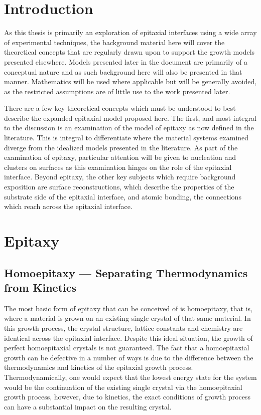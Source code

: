 \section{Introduction}
As this thesis is primarily an exploration of epitaxial interfaces using a wide array of experimental techniques, the background material here will cover the theoretical concepts that are regularly drawn upon to support the growth models presented elsewhere.
Models presented later in the document are primarily of a conceptual nature and as such background here will also be presented in that manner.
Mathematics will be used where applicable but will be generally avoided, as the restricted assumptions are of little use to the work presented later.

There are a few key theoretical concepts which must be understood to best describe the expanded epitaxial model proposed here.
The first, and most integral to the discussion is an examination of the model of epitaxy as now defined in the literature.
This is integral to differentiate where the material systems examined diverge from the idealized models presented in the literature.
As part of the examination of epitaxy, particular attention will be given to nucleation and clusters on surfaces as this examination hinges on the role of the epitaxial interface.
Beyond epitaxy, the other key subjects which require background exposition are surface reconstructions, which describe the properties of the substrate side of the epitaxial interface, and atomic bonding, the connections which reach across the epitaxial interface.

\section{Epitaxy}
\subsection{Homoepitaxy --- Separating Thermodynamics from Kinetics}
The most basic form of epitaxy that can be conceived of is homoepitaxy, that is, where a material is grown on an existing single crystal of that same material.
In this growth process, the crystal structure, lattice constants and chemistry are identical across the epitaxial interface.
Despite this ideal situation, the growth of perfect homoepitaxial crystals is not guaranteed.
The fact that a homoepitaxial growth can be defective in a number of ways is due to the difference between the thermodynamics and kinetics of the epitaxial growth process.
Thermodynamically, one would expect that the lowest energy state for the system would be the continuation of the existing single crystal via the homoepitaxial growth process, however, due to kinetics, the exact conditions of growth process can have a substantial impact on the resulting crystal.

